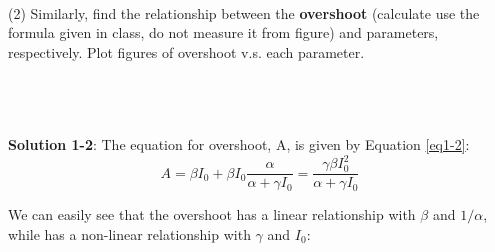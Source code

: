 \documentclass[12pt,letterpaper]{article}
\theoremstyle{definition}
\begin{document}


\\
(2) Similarly, find the relationship between the \textbf{overshoot} (calculate use the formula
given in class, do not measure it from figure) and parameters, respectively. Plot
figures of overshoot v.s. each parameter.

\\
\\
\\
\textbf{Solution 1-2}:
The equation for overshoot, A, is given by Equation \ref{eq1-2}:
\begin{equation}
    A = \beta {I_0} + \beta {I_0}\frac{\alpha }{{\alpha  + \gamma {I_0}}} = \frac{{\gamma \beta I_0^2}}{{\alpha  + \gamma {I_0}}} \label{eq1-2}
\end{equation}

We can easily see that the overshoot has a linear relationship with $\beta$ and $1/\alpha$, while has a non-linear relationship with  $\gamma$ and  $I_0$:
\end{document}
